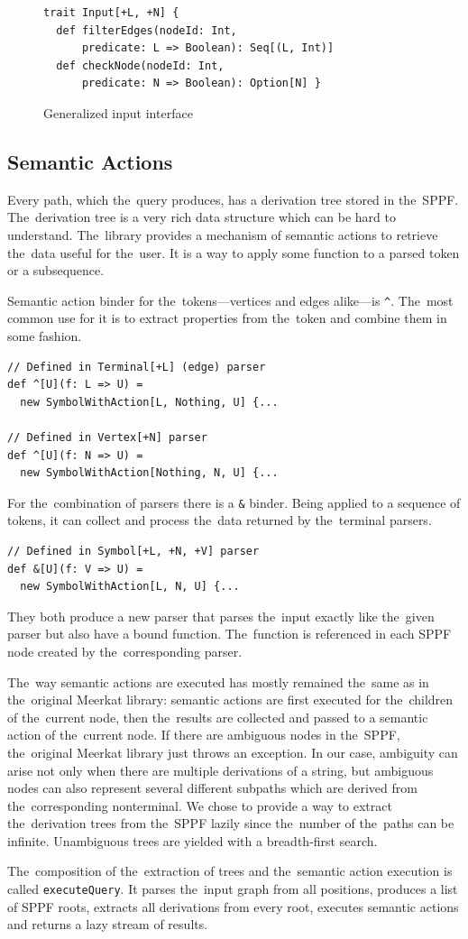 \begin{figure}[t]
\begin{lstlisting}
trait Input[+L, +N] {
  def filterEdges(nodeId: Int,
      predicate: L => Boolean): Seq[(L, Int)]
  def checkNode(nodeId: Int,
      predicate: N => Boolean): Option[N] }
\end{lstlisting}
\caption{Generalized input interface}
\label{fig:input}
\end{figure}

\subsection{Semantic Actions}
\label{sec:semanticActions}

Every path, which the~query produces, has a derivation tree stored in the~SPPF.
The~derivation tree is a very rich data structure which can be hard to understand.
The~library provides a mechanism of semantic actions to retrieve the~data useful for the~user.
It is a way to apply some function to a parsed token or a subsequence.

Semantic action binder for the~tokens---vertices and edges alike---is \lstinline{^}. The~most common use for it is to extract properties from the~token and combine them in some fashion.

\begin{lstlisting}
// Defined in Terminal[+L] (edge) parser
def ^[U](f: L => U) =
  new SymbolWithAction[L, Nothing, U] {...

// Defined in Vertex[+N] parser
def ^[U](f: N => U) =
  new SymbolWithAction[Nothing, N, U] {...
\end{lstlisting}

For the~combination of parsers there is a \lstinline{&} binder. Being  applied to a sequence of tokens, it can collect and process the~data returned by the~terminal parsers.

\begin{lstlisting}
// Defined in Symbol[+L, +N, +V] parser
def &[U](f: V => U) =
  new SymbolWithAction[L, N, U] {...
\end{lstlisting}

They both produce a new parser that parses the~input exactly like the~given parser but also have a bound function.
The~function is referenced in each SPPF node created by the~corresponding parser.

The~way semantic actions are executed has mostly remained the~same as in the~original Meerkat library: semantic actions are first executed for the~children of the~current node, then the~results are collected and passed to a semantic action of the~current node.
If there are ambiguous nodes in the~SPPF, the~original Meerkat library just throws an exception.
In our case, ambiguity can arise not only when there are multiple derivations of a string, but ambiguous nodes can also represent several different subpaths which are derived from the~corresponding nonterminal.
We chose to provide a way to extract the~derivation trees from the~SPPF lazily since the~number of the~paths can be infinite.
Unambiguous trees are yielded with a breadth-first search.

The~composition of the~extraction of trees and the~semantic action execution is called \lstinline{executeQuery}.
It parses the~input graph from all positions, produces a list of SPPF roots, extracts all derivations from every root, executes semantic actions and returns a lazy stream of results.
